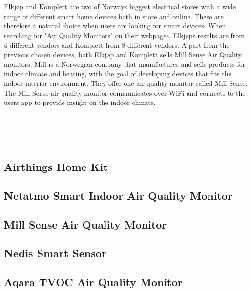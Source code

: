 \\\\
Elkjøp \cite{Elkjøp} and Komplett \cite{Komplett} are two of Norways biggest electrical stores with a wide range of different smart home devices both in store and online. These are therefore a natural choice when users are looking for smart devices. When searching for "Air Quality Monitors" on their webpages, Elkjøps results are from 4 different vendors and Komplett from 8 different vendors. A part from the previous chosen devices, both Elkjøp and Komplett sells Mill Sense Air Quality monitors. Mill \cite{Mill} is a Norwegian company that manufactures and sells products for indoor climate and heating, with the goal of developing devices that fits the indoor interior environment. They offer one air quality monitor called Mill Sense. The Mill Sense air quality monitor communicates over WiFi and connects to the users app to provide insight on the indoor climate.
\\\\

\\\\\
\subsection*{Airthings Home Kit}

\subsection*{Netatmo Smart Indoor Air Quality Monitor}

\subsection*{Mill Sense Air Quality Monitor}

\subsection*{Nedis Smart Sensor}

\subsection*{Aqara TVOC Air Quality Monitor}

